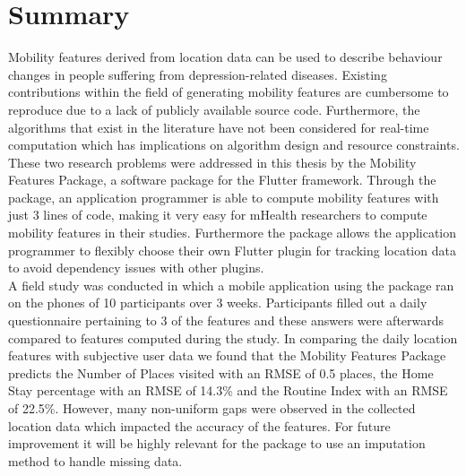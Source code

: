 \chapter{Summary}
Mobility features derived from location data can be used to describe behaviour changes in people suffering from depression-related diseases. Existing contributions within the field of generating mobility features are cumbersome
to reproduce due to a lack of publicly available source code. Furthermore, the
algorithms that exist in the literature have not been considered for real-time computation which has implications on algorithm design and resource constraints. These two research problems were addressed in this thesis by the Mobility Features Package, a software package for the Flutter framework. Through the package, an application programmer is able to compute mobility features with just 3 lines of code, making it very easy for mHealth researchers to compute mobility features in their studies. Furthermore the package allows the application programmer to flexibly choose their own Flutter plugin for tracking location data to avoid dependency issues with other plugins.\\ 

A field study was conducted in which a mobile application using the package ran on the phones of 10 participants over 3 weeks. Participants filled out a daily questionnaire pertaining to 3 of the features and these answers were afterwards compared to features computed during the study. In comparing the daily location features with subjective user data we found that the Mobility Features Package predicts the Number of Places visited with an RMSE of 0.5 places, the Home Stay percentage with an RMSE of 14.3\% and the Routine Index with an RMSE of 22.5\%. However, many non-uniform gaps were observed in the collected location data which impacted the accuracy of the features. For future improvement it will be highly relevant for the package to use an imputation method to handle missing data.
